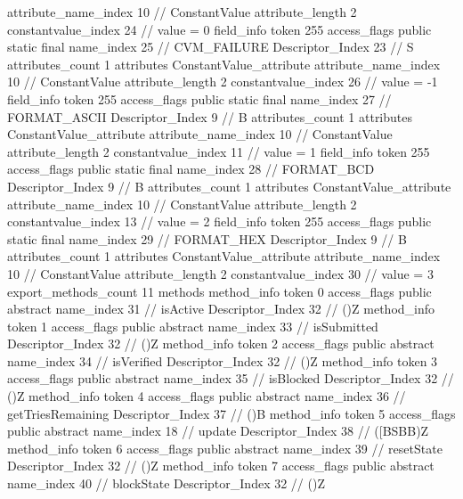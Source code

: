 {{{{{{{					attribute_name_index	10		// ConstantValue
					attribute_length	2
					constantvalue_index	24		// value = 0
				}
				}
			}
			field_info {
				token	255
				access_flags	public static final
				name_index	25		// CVM_FAILURE
				Descriptor_Index	23		// S
				attributes_count	1
				attributes {
				ConstantValue_attribute {
					attribute_name_index	10		// ConstantValue
					attribute_length	2
					constantvalue_index	26		// value = -1
				}
				}
			}
			field_info {
				token	255
				access_flags	public static final
				name_index	27		// FORMAT_ASCII
				Descriptor_Index	9		// B
				attributes_count	1
				attributes {
				ConstantValue_attribute {
					attribute_name_index	10		// ConstantValue
					attribute_length	2
					constantvalue_index	11		// value = 1
				}
				}
			}
			field_info {
				token	255
				access_flags	public static final
				name_index	28		// FORMAT_BCD
				Descriptor_Index	9		// B
				attributes_count	1
				attributes {
				ConstantValue_attribute {
					attribute_name_index	10		// ConstantValue
					attribute_length	2
					constantvalue_index	13		// value = 2
				}
				}
			}
			field_info {
				token	255
				access_flags	public static final
				name_index	29		// FORMAT_HEX
				Descriptor_Index	9		// B
				attributes_count	1
				attributes {
				ConstantValue_attribute {
					attribute_name_index	10		// ConstantValue
					attribute_length	2
					constantvalue_index	30		// value = 3
				}
				}
			}
			}
			export_methods_count	11
			methods {
				method_info {
					token	0
					access_flags	public abstract
					name_index	31		// isActive
					Descriptor_Index	32		// ()Z
				}
				method_info {
					token	1
					access_flags	public abstract
					name_index	33		// isSubmitted
					Descriptor_Index	32		// ()Z
				}
				method_info {
					token	2
					access_flags	public abstract
					name_index	34		// isVerified
					Descriptor_Index	32		// ()Z
				}
				method_info {
					token	3
					access_flags	public abstract
					name_index	35		// isBlocked
					Descriptor_Index	32		// ()Z
				}
				method_info {
					token	4
					access_flags	public abstract
					name_index	36		// getTriesRemaining
					Descriptor_Index	37		// ()B
				}
				method_info {
					token	5
					access_flags	public abstract
					name_index	18		// update
					Descriptor_Index	38		// ([BSBB)Z
				}
				method_info {
					token	6
					access_flags	public abstract
					name_index	39		// resetState
					Descriptor_Index	32		// ()Z
				}
				method_info {
					token	7
					access_flags	public abstract
					name_index	40		// blockState
					Descriptor_Index	32		// ()Z
}}}}}
